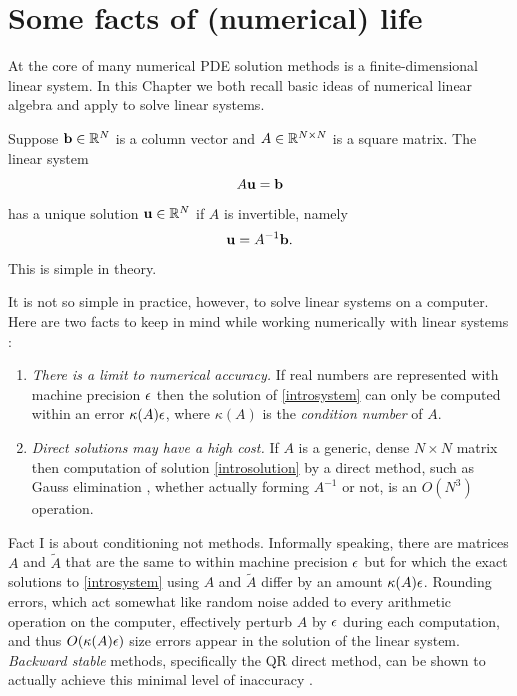 \section{Some facts of (numerical) life}

At the core of many numerical PDE solution methods is a finite-dimensional linear system.  In this Chapter we both recall basic ideas of numerical linear algebra and apply \PETSc to solve linear systems.

Suppose $\mathbf{b}\in \mathbb{R}^{N}$ is a column vector and $A\in\mathbb{R}^{N\times N}$ is a square matrix.  The linear system
\begin{equation}
A \mathbf{u} = \mathbf{b} \label{introsystem}
\end{equation}
has a unique solution $\mathbf{u}\in \mathbb{R}^{N}$ if $A$ is invertible, namely
\begin{equation}
\mathbf{u} = A^{-1} \mathbf{b}. \label{introsolution}
\end{equation}
This is simple in theory.

It is not so simple in practice, however, to solve linear systems on a computer.  Here are two facts to keep in mind while working numerically with linear systems \citep{TrefethenBau1997}:
\renewcommand{\labelenumi}{Fact \Roman{enumi}.}
\begin{enumerate}
\item \label{page:ls:limittoaccuracy} \emph{There is a limit to numerical accuracy.}  If real numbers are represented with machine precision $\epsilon$ then the solution of \eqref{introsystem} can only be computed within an error $\kappa(A) \epsilon$, where $\kappa(A)$ is the \emph{condition number} of $A$.
\item \emph{Direct solutions may have a high cost.}  If $A$ is a generic, dense $N\times N$ matrix then computation of solution \eqref{introsolution} by a direct method, such as Gauss elimination \citep{TrefethenBau1997}, whether actually forming $A^{-1}$ or not, is an $O(N^3)$ operation.
\end{enumerate}

Fact I is about conditioning not methods.  Informally speaking, there are matrices $A$ and $\tilde A$ that are the same to within machine precision $\epsilon$ but for which the exact solutions to \eqref{introsystem} using $A$ and $\tilde A$ differ by an amount $\kappa(A) \epsilon$.  Rounding errors, which act somewhat like random noise added to every arithmetic operation on the computer, effectively perturb $A$ by $\epsilon$ during each computation, and thus $O(\kappa(A) \epsilon)$ size errors appear in the solution of the linear system.  \emph{Backward stable} methods, specifically the QR direct method, can be shown to actually achieve this minimal level of inaccuracy \citep{TrefethenBau1997}.

